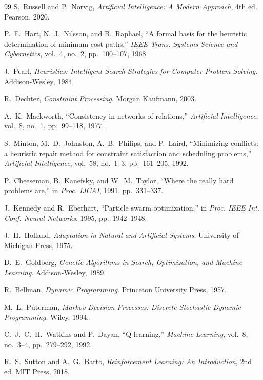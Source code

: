 \documentclass[10pt]{article}
\begin{document}
\begin{thebibliography}{99}
\small
{} S.~Russell and P.~Norvig,
\emph{Artificial Intelligence: A Modern Approach}, 4th ed. Pearson, 2020.

 P.~E.~Hart, N.~J.~Nilsson, and B.~Raphael,
``A formal basis for the heuristic determination of minimum cost paths,''
\emph{IEEE Trans. Systems Science and Cybernetics}, vol.~4, no.~2, pp.~100--107, 1968.

 J.~Pearl,
\emph{Heuristics: Intelligent Search Strategies for Computer Problem Solving}.
Addison-Wesley, 1984.

 R.~Dechter,
\emph{Constraint Processing}. Morgan Kaufmann, 2003.

 A.~K.~Mackworth,
``Consistency in networks of relations,''
\emph{Artificial Intelligence}, vol.~8, no.~1, pp.~99--118, 1977.

 S.~Minton, M.~D.~Johnston, A.~B.~Philips, and P.~Laird,
``Minimizing conflicts: a heuristic repair method for constraint satisfaction and
scheduling problems,''
\emph{Artificial Intelligence}, vol.~58, no.~1--3, pp.~161--205, 1992.

 P.~Cheeseman, B.~Kanefsky, and W.~M.~Taylor,
``Where the really hard problems are,''
in \emph{Proc. IJCAI}, 1991, pp.~331--337.

 J.~Kennedy and R.~Eberhart,
``Particle swarm optimization,''
in \emph{Proc. IEEE Int. Conf. Neural Networks}, 1995, pp.~1942--1948.

 J.~H.~Holland,
\emph{Adaptation in Natural and Artificial Systems}.
University of Michigan Press, 1975.

 D.~E.~Goldberg,
\emph{Genetic Algorithms in Search, Optimization, and Machine Learning}.
Addison-Wesley, 1989.

 R.~Bellman,
\emph{Dynamic Programming}. Princeton University Press, 1957.

 M.~L.~Puterman,
\emph{Markov Decision Processes: Discrete Stochastic Dynamic Programming}.
Wiley, 1994.

 C.~J.~C.~H.~Watkins and P.~Dayan,
``Q-learning,'' \emph{Machine Learning}, vol.~8, no.~3--4, pp.~279--292, 1992.

 R.~S.~Sutton and A.~G.~Barto,
\emph{Reinforcement Learning: An Introduction}, 2nd ed. MIT Press, 2018.
\end{thebibliography}
\end{document}
